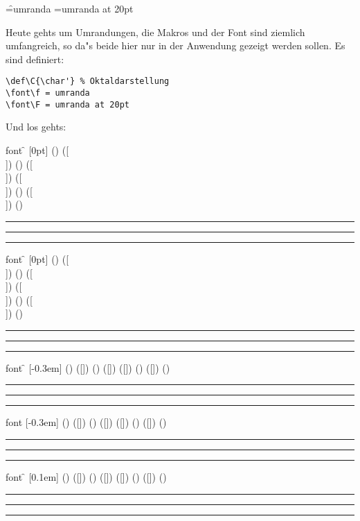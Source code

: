 \newpage\setcounter{page}{1}
\font\f=umranda
\font\F=umranda at 20pt
{\def\make{
          \vskip 2mm
		  \hrule
          
		  \vskip 2mm\hrule\hrule\vskip 1mm}
\fussy
{}

Heute gehts um Umrandungen, die Makros und der Font sind ziemlich
umfangreich, so da"s beide hier nur in der Anwendung gezeigt werden sollen.
Es sind definiert:
\begin{verbatim}
\def\C{\char'} % Oktaldarstellung
\font\f = umranda
\font\F = umranda at 20pt
\end{verbatim}
Und los gehts:
\vskip 2mm

\begin{bsp}
         font {\f} [0pt]
         () ([\\]) ()
         ([\\])        ([\\])
         () ([\\]) ()
\end{bsp}
\make

\begin{bsp}
         font {\f} [0pt]
         () ([\\]) ()
         ([\\])           ([\\])
         () ([\\]) ()
\end{bsp}
\make



\begin{bsp}
         font {\f} [-0.3em]
         () ([]) ()
         ([])   ([])
         () ([]) ()
\end{bsp}
\make



\begin{bsp}
         font {\F} [-0.3em]
         () ([]) ()
         ([])   ([])
         () ([]) ()
\end{bsp}
\make



\begin{bsp}
         font {\f} [0.1em]
         () ([]) ()
         ([])         ([])
         () ([]) ()
\end{bsp}
\make



}
